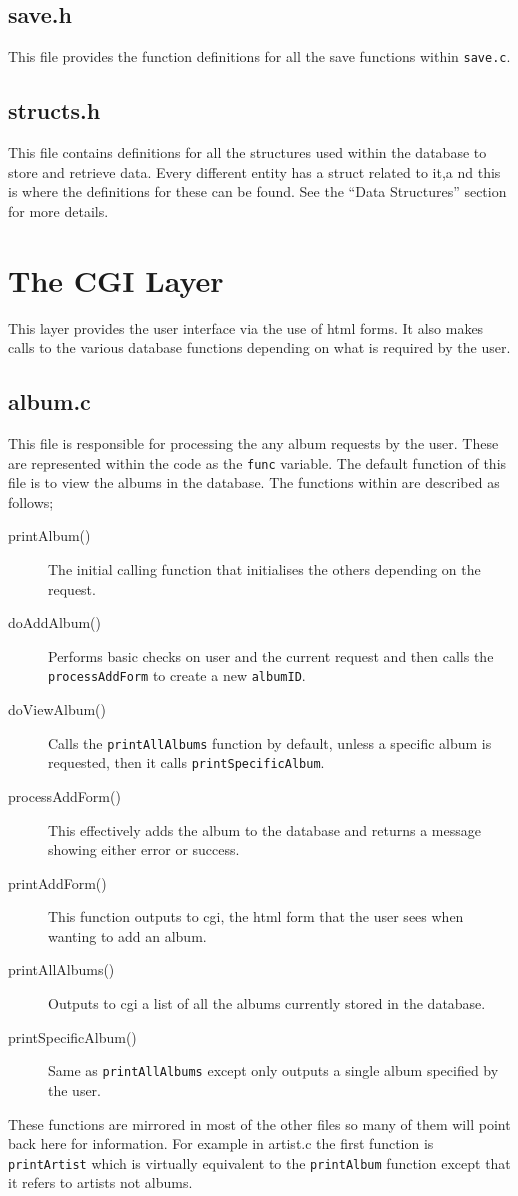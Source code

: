 \documentclass{article}
\begin{document}
\subsection{save.h}
This file provides the function definitions for all the save functions within \verb|save.c|.

\subsection{structs.h}
This file contains definitions for all the structures used within the database to store and retrieve data. Every different entity has a struct related to it,a nd this is where the definitions for these can be found. See the ``Data Structures'' section for more details.

\section{The CGI Layer}
This layer provides the user interface via the use of html forms. It also makes calls to the various database functions depending on what is required by the user.

\subsection{album.c}
This file is responsible for processing the any album requests by the user. These are represented within the code as the \verb|func| variable. The default function of this file is to view the albums in the database. The functions within are described as follows;
\begin{description}
\item[printAlbum()] The initial calling function that initialises the others depending on the request.
\item[doAddAlbum()]Performs basic checks on user and the current request and then calls the \verb|processAddForm| to create a new \verb|albumID|.
\item[doViewAlbum()]Calls the \verb|printAllAlbums| function by default, unless a specific album is requested, then it calls \verb|printSpecificAlbum|.
\item[processAddForm()] This effectively adds the album to the database and returns a message showing either error or success.
\item[printAddForm()] This function outputs to cgi, the html form that the user sees when wanting to add an album.
\item[printAllAlbums()]
Outputs to cgi a list of all the albums currently stored in the database.
\item[printSpecificAlbum()]
Same as \verb|printAllAlbums| except only outputs a single album specified by the user.
\end{description}
These functions are mirrored in most of the other files so many of them will point back here for information. For example in artist.c the first function is \verb|printArtist| which is virtually equivalent to the \verb|printAlbum| function except that it refers to artists not albums. 
\end{document}
